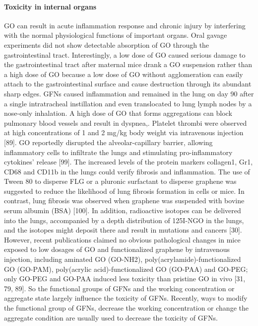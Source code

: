 \documentclass[twoside,twocolumn,9pt]{article}
\begin{document}
\paragraph{Toxicity in internal organs}
GO can result in acute inflammation response and chronic injury by interfering with the normal physiological functions of important organs. Oral gavage experiments did not show detectable absorption of GO through the gastrointestinal tract. Interestingly, a low dose of GO caused serious damage to the gastrointestinal tract after maternal mice drank a GO suspension rather than a high dose of GO because a low dose of GO without agglomeration can easily attach to the gastrointestinal surface and cause destruction through its abundant sharp edges. GFNs caused inflammation and remained in the lung on day 90 after a single intratracheal instillation and even translocated to lung lymph nodes by a nose-only inhalation. A high dose of GO that forms aggregations can block pulmonary blood vessels and result in dyspnea,. Platelet thrombi were observed at high concentrations of 1 and 2 mg/kg body weight via intravenous injection [89]. GO reportedly disrupted the alveolar-capillary barrier, allowing inflammatory cells to infiltrate the lungs and stimulating pro-inflammatory cytokines' release [99]. The increased levels of the protein markers collagen1, Gr1, CD68 and CD11b in the lungs could verify fibrosis and inflammation. The use of Tween 80 to disperse FLG or a pluronic surfactant to disperse graphene was suggested to reduce the likelihood of lung fibrosis formation in cells or mice. In contrast, lung fibrosis was observed when graphene was suspended with bovine serum albumin (BSA) [100]. In addition, radioactive isotopes can be delivered into the lungs, accompanied by a depth distribution of 125I-NGO in the lungs, and the isotopes might deposit there and result in mutations and cancers [30]. However, recent publications claimed no obvious pathological changes in mice exposed to low dosages of GO and functionalized graphene by intravenous injection, including aminated GO (GO-NH2), poly(acrylamide)-functionalized GO (GO-PAM), poly(acrylic acid)-functionalized GO (GO-PAA) and GO-PEG; only GO-PEG and GO-PAA induced less toxicity than pristine GO in vivo [31, 79, 89]. So the functional groups of GFNs and the working concentration or aggregate state largely influence the toxicity of GFNs. Recently, ways to modify the functional group of GFNs, decrease the working concentration or change the aggregate condition are usually used to decrease the toxicity of GFNs.
\end{document}
